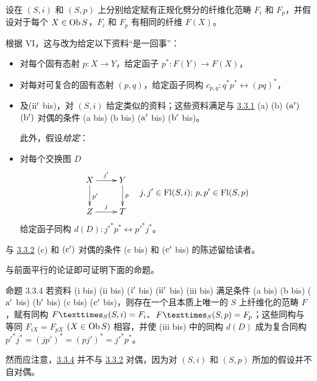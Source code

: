 \subsubsection{}

设在 $(S,i)$ 和 $(S,p)$ 上分别给定赋有正规化劈分的纤维化范畴 $F_i$ 和 $F_p$，并假设对于每个 $X\in \operatorname{Ob} S$，$F_i$ 和 $F_p$ 有相同的纤维 $F(X)$。

根据  VI，这与改为给定以下资料“是一回事”：
\begin{itemize}
\item[(i bis)] 对每个固有态射 $p:X\rightarrow Y$，给定函子 $p^{\ast}:F(Y)\rightarrow F(X)$，

\item[(ii bis)] 对每对可复合的固有态射 $(p,q)$，给定函子同构 $c_{p,q}:q^{\ast}p^{\ast}\leftrightarrow (pq)^{\ast}$，

\item[(${\rm i'}$ bis)] 及\pageoriginale (${\rm ii'}$ bis)，对 $(S,i)$ 给定类似的资料；这些资料满足与 \hyperref[XVII.subsubsec3.3.1]{3.3.1} (a) (b) ${\rm (a')}$ ${\rm (b')}$ 对偶的条件 (a bis) (b bis) (${\rm a'}$ bis) (${\rm b'}$ bis)。

此外，假设\emph{给定}：

\item[(iii bis)] 对每个交换图 $D$
\[
\vcenter{
\xymatrix{
X \ar[r]^{j'} \ar[d]^{p'}&  Y\ar[d]^{p} \\
Z \ar[r]^{j}& T
}}\quad j,j' \in \Fl(S,i)\text{; }p\sisi{}{,} p' \in \Fl(S,p)
\]
给定函子同构 $d(D):{j'}^{\ast}p^{\ast}\leftrightarrow
{p'}^{\ast}j^{\ast}$。
\end{itemize}

与 \hyperref[XVII.prop3.3.2]{3.3.2} (c) 和 ${\rm (c')}$ 对偶的条件 (c bis) 和 (${\rm c'}$ bis) 的陈述留给读者。

与前面平行的论证即可证明下面的命题。

\begin{enonce*}{命题 3.3.4}
若资料 {\rm (i bis) (ii bis) (${\rm i'}$ bis) (${\rm ii'}$ bis) (iii bis)} 满足条件 {\rm (a bis) (b bis) (${\rm
a'}$ bis) (${\rm b'}$ bis) (c bis) (${\rm c'}$ bis)}，则存在一个且本质上唯一的 $S$ 上纤维化的范畴 $F$，赋有同构 $\fprod{F}{(S,i)}{S}=F_i$、$\fprod{F}{(S,p)}{S}=F_p$；这些同构与等同 $F_{iX}=F_{pX}$ $(X\in \operatorname{Ob} S)$ 相容，并使 {\rm (iii bis)} 中的同构 $d(D)$ 成为复合同构 ${p'}^{\ast}j^{\ast}=(jp')^{\ast}=(pj')^{\ast}={j'}^{\ast}p^{\ast}$。
\end{enonce*}

然而应注意，\hyperref[XVII.prop3.3.4]{3.3.4} 并不与 \hyperref[XVII.prop3.3.2]{3.3.2} 对偶，因为对 $(S,i)$ 和 $(S,p)$ 所加的假设并不自对偶。

